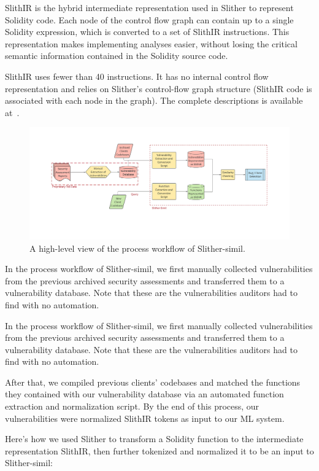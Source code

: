 SlithIR is the hybrid intermediate representation used in Slither to represent Solidity code. Each node of the control flow graph can contain up to a single Solidity expression, which is converted to a set of SlithIR instructions.
This representation makes implementing analyses easier, without losing the critical semantic information contained in the Solidity source code.

SlithIR uses fewer than 40 instructions. It has no internal control flow representation and relies on Slither's control-flow graph structure (SlithIR code is associated with each node in the graph).
The complete descriptions is available at~\cite{slithir}.

\begin{figure}
  \centering
  \includegraphics[width=\textwidth]{figures/slitherS.png}
  \caption{A high-level view of the process workflow of Slither-simil.}
  \label{fig:slithersimilhighlevel}
\end{figure}

In the process workflow of Slither-simil, we first manually collected vulnerabilities from the previous archived security assessments and transferred them to a vulnerability database.
Note that these are the vulnerabilities auditors had to find with no automation.

In the process workflow of Slither-simil, we first manually collected vulnerabilities from the previous archived security assessments and transferred them to a vulnerability database.
Note that these are the vulnerabilities auditors had to find with no automation.

After that, we compiled previous clients' codebases and matched the functions they contained with our vulnerability database via an automated function extraction and normalization script.
By the end of this process, our vulnerabilities were normalized SlithIR tokens as input to our ML system.

Here's how we used Slither to transform a Solidity function to the intermediate representation SlithIR, then further tokenized and normalized it to be an input to Slither-simil:

